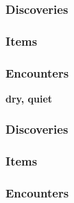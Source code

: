\subsubsection{Discoveries}
\begin{itemize}
\end{itemize}
\subsubsection{Items}
\begin{itemize}
\end{itemize}
\subsubsection{Encounters}
\begin{itemize}
\end{itemize}

\textbf{dry, quiet}
\begin{DndReadAloud}
\end{DndReadAloud}
\subsubsection{Discoveries}
\begin{itemize}
\end{itemize}
\subsubsection{Items}
\begin{itemize}
\end{itemize}
\subsubsection{Encounters}
\begin{itemize}
\end{itemize}

\vfill
